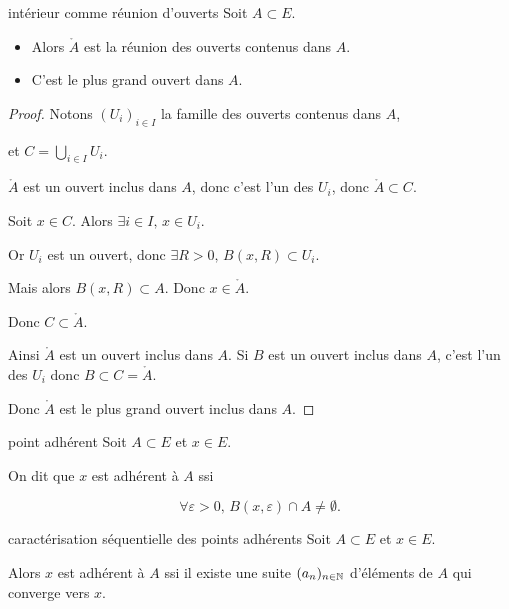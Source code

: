 \begin{theoreme}{intérieur comme réunion d'ouverts}{}
    Soit $A \subset E$.

    \begin{itemize}
        \item Alors $\mathring{A}$ est la réunion des ouverts contenus dans $A$.
        \item C'est le plus grand ouvert dans $A$.
    \end{itemize}
\end{theoreme}

\begin{proof}
    Notons $(U_i)_{i \in I}$ la famille des ouverts contenus dans $A$, 
    
    et $C = \bigcup_{i \in I} U_i$.

    $\mathring A$ est un ouvert inclus dans $A$, donc c'est l'un des $U_i$, donc $\mathring A \subset C$.

    Soit $x \in C$. Alors $\exists i \in I, \, x \in U_i$.

    Or $U_i$ est un ouvert, donc $\exists R > 0, \, B(x, R) \subset U_i$. 

    Mais alors $B(x, R) \subset A$. Donc $x \in \mathring A$.

    Donc $C \subset \mathring A$.

    Ainsi $\mathring A$ est un ouvert inclus dans $A$. Si $B$ est un ouvert inclus dans 
    $A$, c'est l'un des $U_i$ donc $B \subset C = \mathring A$.

    Donc $\mathring A$ est le plus grand ouvert inclus dans $A$.
\end{proof}

\begin{definition}{point adhérent}{}
    Soit $A \subset E$ et $x \in E$.

    On dit que $x$ est adhérent à $A$ ssi 

    $$ \forall \varepsilon > 0, \, B(x, \varepsilon) \cap A \neq \emptyset.$$
\end{definition}

\begin{theoreme}{caractérisation séquentielle des points adhérents}{}
    Soit $A \subset E$ et $x \in E$.

    Alors $x$ est adhérent à $A$ ssi il existe une suite $(a_n)_{n \in \mathbb{N}}$ d'éléments de $A$ 
    qui converge vers $x$.
\end{theoreme}


